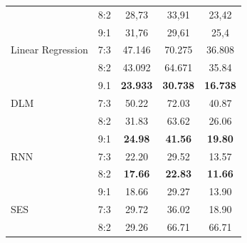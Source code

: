 \documentclass[conference]{IEEEtran}
\begin{document}
\begin{table}[ht]
\begin{tabular}{|l|l|c|c|c|}
                               & 8:2                         & 28,73                     & 33,91                          & 23,42                    \\ \cline{2-5}
                               & 9:1                         & 31,76                     & 29,61                          & 25,4                     \\ \hline
        Linear Regression      & 7:3                         & 47.146                    & 70.275                         & 36.808                   \\ \cline{2-5}
                               & 8:2                         & 43.092                    & 64.671                         & 35.84                    \\ \cline{2-5}
                               & 9.1                         & \textbf{23.933}           & \textbf{30.738}                & \textbf{16.738}          \\ \hline
        DLM                    & 7:3                         & 50.22                     & 72.03                          & 40.87                    \\ \cline{2-5}
                               & 8:2                         & 31.83                     & 63.62                          & 26.06                    \\ \cline{2-5}
                               & 9:1                         & \textbf{24.98}            & \textbf{41.56}                 & \textbf{19.80}           \\ \hline
        RNN                    & 7:3                         & 22.20                     & 29.52                          & 13.57                    \\ \cline{2-5}
                               & 8:2                         & \textbf{17.66}            & \textbf{22.83}                 & \textbf{11.66}           \\ \cline{2-5}
                               & 9:1                         & 18.66                     & 29.27                          & 13.90                    \\ \hline
        SES                    & 7:3                         & 29.72                     & 36.02                          & 18.90                    \\ \cline{2-5}
                               & 8:2                         & 29.26                     & 66.71                          & 66.71                    \\ \cline{2-5}

\end{tabular}
\end{table}
\end{document}

